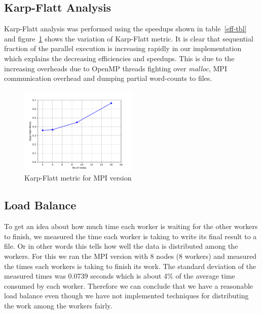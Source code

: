 \documentclass[12pt]{article}
\begin{document}
\subsection{Karp-Flatt Analysis}
Karp-Flatt analysis was performed using the speedups shown in table~\ref{eff-tbl} and figure~\ref{evals} shows the variation of Karp-Flatt
metric. It is clear that sequential fraction of the parallel execution is increasing rapidly in our implementation which explains the decreasing
efficiencies and speedups. This is due to the increasing overheads due to OpenMP threads fighting over {\em malloc}, MPI communication overhead and
dumping partial word-counts to files.

\begin{figure}[H]
\centering
\includegraphics[width=0.5\textwidth]{fig/evals.pdf}
\caption{Karp-Flatt metric for MPI version \label{evals}}
\end{figure}

\subsection{Load Balance}
To get an idea about how much time each worker is waiting for the other workers to finish, we measured the time each worker is taking to write 
its final result to a file. Or in other words this tells how well the data is distributed among the workers. For this we ran the MPI version with 8 nodes (8 workers) and
measured the times each workers is taking to finish its work. The standard deviation of the measured times was 0.0739 seconds which is about 4\% of the average
time consumed by each worker. Therefore we can conclude that we have a reasonable load balance even though we have not implemented techniques for distributing 
the work among the workers fairly.
\end{document}
